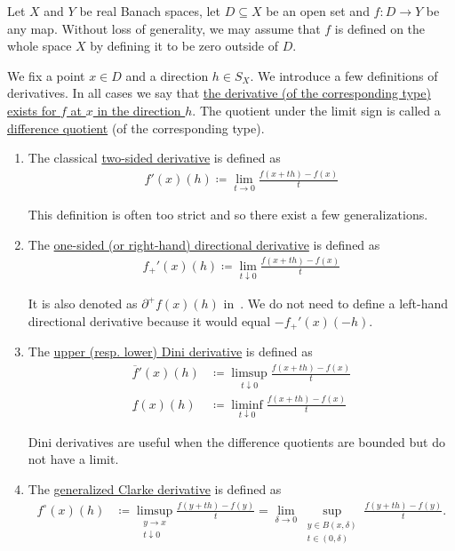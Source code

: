 Let $X$ and $Y$ be real Banach spaces, let $D \subseteq X$ be an open set and $f: D \to Y$ be any map. Without loss of generality, we may assume that $f$ is defined on the whole space $X$ by defining it to be zero outside of $D$.

\begin{definition}\label{def:analysis:banach:derivatives}
  We fix a point $x \in D$ and a direction $h \in S_X$. We introduce a few definitions of derivatives. In all cases we say that \uline{the derivative (of the corresponding type) exists for $f$ at $x$ in the direction $h$}. The quotient under the limit sign is called a \uline{difference quotient} (of the corresponding type).

  \begin{enumerate}
    \item\label{def:analysis:banach:derivatives} The classical \uline{two-sided derivative} is defined as
    \begin{align*}
      f'(x)(h) \coloneqq \lim_{t \to 0} \frac {f(x + th) - f(x)} t
    \end{align*}

    This definition is often too strict and so there exist a few generalizations.

    \item\cite[lemma 1.2]{Phelps1993} The \uline{one-sided (or right-hand) directional derivative} is defined as
    \begin{align*}
      f_+'(x)(h) \coloneqq \lim_{t \downarrow 0} \frac {f(x + th) - f(x)} t
    \end{align*}

    It is also denoted as $\partial^+ f(x)(h)$ in~\cite[lemma 1.2]{Phelps1993}. We do not need to define a left-hand directional derivative because it would equal $-f_+'(x)(-h)$.

    \item\cite[definition 11.18]{Clarke2013} The \uline{upper (resp. lower) Dini derivative} is defined as
    \begin{align*}
      \overline f'(x)(h) &\coloneqq \limsup_{t \downarrow 0} \frac {f(x + th) - f(x)} t
      \\
      \underline f(x)(h) &\coloneqq \liminf_{t \downarrow 0} \frac {f(x + th) - f(x)} t
    \end{align*}

    Dini derivatives are useful when the difference quotients are bounded but do not have a limit.

    \item\cite[195]{Clarke2013} The \uline{generalized Clarke derivative} is defined as
    \begin{align*}
      f^\circ(x)(h)
      &\coloneqq
      \limsup_{\substack{y \to x \\ t \downarrow 0}} \frac {f(y + th) - f(y)} t
      =
      \lim_{\delta \to 0} \sup_{\substack{y \in B(x, \delta) \\ t \in (0, \delta)}} \frac {f(y + th) - f(y)} t.
    \end{align*}

  \end{enumerate}
\end{definition}

